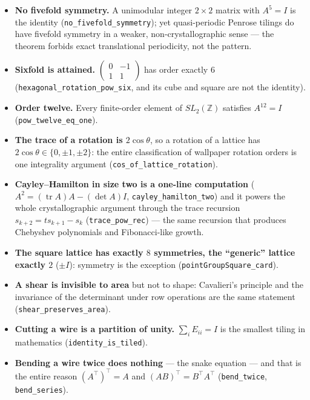 \documentclass[11pt]{article}
\theoremstyle{definition}
\theoremstyle{plain}
\theoremstyle{remark}
\newcommand{\lean}[1]{\texttt{\small #1}}
\newcommand{\Z}{\mathbb{Z}}
\newcommand{\tr}{\operatorname{tr}}
\begin{document}
\begin{itemize}
\item \textbf{No fivefold symmetry.}  A unimodular integer $2\times2$ matrix
  with $A^5=I$ is the identity (\lean{no\_fivefold\_symmetry}); yet
  quasi-periodic Penrose tilings do have fivefold symmetry in a weaker,
  non-crystallographic sense --- the theorem forbids exact translational
  periodicity, not the pattern.
\item \textbf{Sixfold is attained.} $\left(\begin{smallmatrix}0&-1\\1&1
  \end{smallmatrix}\right)$ has order exactly $6$
  (\lean{hexagonal\_rotation\_pow\_six}, and its cube and square are not the
  identity).
\item \textbf{Order twelve.} Every finite-order element of $SL_2(\Z)$ satisfies
  $A^{12}=I$ (\lean{pow\_twelve\_eq\_one}).
\item \textbf{The trace of a rotation is $2\cos\theta$}, so a rotation of a
  lattice has $2\cos\theta\in\{0,\pm1,\pm2\}$: the entire classification of
  wallpaper rotation orders is one integrality argument
  (\lean{cos\_of\_lattice\_rotation}).
\item \textbf{Cayley--Hamilton in size two is a one-line computation}
  ($A^2 = (\tr A)A - (\det A)I$, \lean{cayley\_hamilton\_two}) and it powers the
  whole crystallographic argument through the trace recursion
  $s_{k+2} = t s_{k+1} - s_k$ (\lean{trace\_pow\_rec}) --- the same recursion
  that produces Chebyshev polynomials and Fibonacci-like growth.
\item \textbf{The square lattice has exactly $8$ symmetries, the ``generic''
  lattice exactly $2$} ($\pm I$): symmetry is the exception
  (\lean{pointGroupSquare\_card}).
\item \textbf{A shear is invisible to area} but not to shape: Cavalieri's
  principle and the invariance of the determinant under row operations are the
  same statement (\lean{shear\_preserves\_area}).
\item \textbf{Cutting a wire is a partition of unity.}  $\sum_i E_{ii} = I$ is
  the smallest tiling in mathematics (\lean{identity\_is\_tiled}).
\item \textbf{Bending a wire twice does nothing} --- the snake equation --- and
  that is the entire reason $(A^{\!\top})^{\!\top} = A$ and
  $(AB)^{\!\top}=B^{\!\top}A^{\!\top}$ (\lean{bend\_twice},
  \lean{bend\_series}).
\end{itemize}
\end{document}
